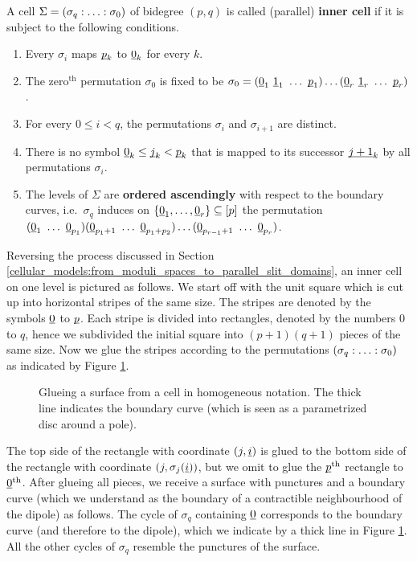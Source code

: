 \begin{defi}
    \label{cellular_models:parallel:inner_cells}
    A cell $\Sigma = \homogq$ of bidegree $(p,q)$ is called (parallel) {\bfseries inner cell} if it is subject to the following conditions.
    \begin{enumerate}
        \item Every $\sigma_i$ maps $\underline{\smash{p}}_k$ to $\underline{\smash{0}}_k$ for every $k$.
        \item The zero${}^{\text{th}}$ permutation $\sigma_0$ is fixed to be $\sigma_0 = (\ul 0_1\ \ul 1_1\ \ldots\ \ul p_1)\ldots (\ul 0_r\ \ul 1_r\ \ldots\ \ul p_r)$.
        \item For every $0 \le i < q$, the permutations $\sigma_i$ and $\sigma_{i+1}$ are distinct.
        \item There is no symbol $\underline{\smash{0}}_k \le \underline{\smash{j}}_k < \underline{\smash{p}}_k$ that is mapped to its successor $\underline{\smash{j+1}}_k$ by all permutations $\sigma_i$.
        \item The levels of $\Sigma$ are {\bfseries ordered ascendingly} with respect to the boundary curves,
            i.e.\ $\sigma_q$ induces on $\{\ul0_1, \ldots, \ul0_r\} \subseteq [p]$ the permutation
            $(\ul0_1\ \ldots\ \ul0_{p_1})(\ul0_{p_1 + 1} \ \ldots\ \ul0_{p_1+p_2}) \ldots (\ul0_{p_{r-1} + 1} \ \ldots\ \ul0_{p_r})$.
    \end{enumerate}
\end{defi}

Reversing the process discussed in Section \ref{cellular_models:from_moduli_spaces_to_parallel_slit_domains}, an inner cell on one level is pictured as follows.
We start off with the unit square which is cut up into horizontal stripes of the same size.
The stripes are denoted by the symbols $\underline{\smash{0}}$ to $\underline{\smash{p}}$.
Each stripe is divided into rectangles, denoted by the numbers $0$ to $q$,
hence we subdivided the initial square into $(p+1)(q+1)$ pieces of the same size.
Now we glue the stripes according to the permutations $\homogq$ as indicated by Figure \ref{cellular_models:parallel:homogeneous_glueing}.
\begin{figure}[ht]
\centering
{}
\caption{\label{cellular_models:parallel:homogeneous_glueing}Glueing a surface from a cell in homogeneous notation.
    The thick line indicates the boundary curve (which is seen as a parametrized disc around a pole).}
\end{figure}
The top side of the rectangle with coordinate $(j,\underline{\smash{i}})$ is glued to the bottom side of the rectangle with coordinate $(j, \sigma_j(\underline{\smash{i}}))$, but we omit to glue the $\underline{\smash{p}}^{\text{th}}$ rectangle to $\underline{\smash{0}}^{\text{th}}$.
After glueing all pieces, we receive a surface with punctures and a boundary curve (which we understand as the boundary of a contractible neighbourhood of the dipole) as follows.
The cycle of $\sigma_q$ containing $\underline{\smash{0}}$ corresponds to the boundary curve (and therefore to the dipole), which we indicate by a thick line in Figure \ref{cellular_models:parallel:homogeneous_glueing}.
All the other cycles of $\sigma_q$ resemble the punctures of the surface.

